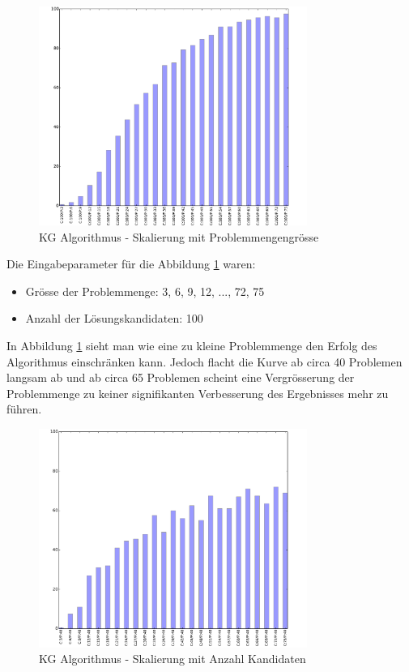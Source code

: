 \begin{figure}[h]
  \centering
  \includegraphics[width=0.78\textwidth]{images/C_G_PS_div5PS_solved.pdf}
  \caption[KG Algorithmus - Skalierung mit Problemmengengrösse]{KG Algorithmus - Skalierung mit Problemmengengrösse}
  \label{fig:c_g_ps_div5}
\end{figure}

Die Eingabeparameter für die Abbildung \ref{fig:c_g_ps_div5} waren:
\begin{itemize}
	\item Grösse der Problemmenge: 3, 6, 9, 12, ..., 72, 75
	\item Anzahl der Lösungskandidaten: 100
\end{itemize}

In Abbildung \ref{fig:c_g_ps_div5} sieht man wie eine zu kleine Problemmenge den Erfolg des Algorithmus einschränken kann. Jedoch flacht die Kurve ab circa 40 Problemen langsam ab und ab circa 65 Problemen scheint eine Vergrösserung der Problemmenge zu keiner signifikanten Verbesserung des Ergebnisses mehr zu führen.

\begin{figure}[H]
  \centering
  \includegraphics[width=0.78\textwidth]{images/C_G_CS_div5CS_solved.pdf}
  \caption[KG Algorithmus - Skalierung mit Anzahl Kandidaten]{KG Algorithmus - Skalierung mit Anzahl Kandidaten}
  \label{fig:c_g_cs_div5}
\end{figure}

